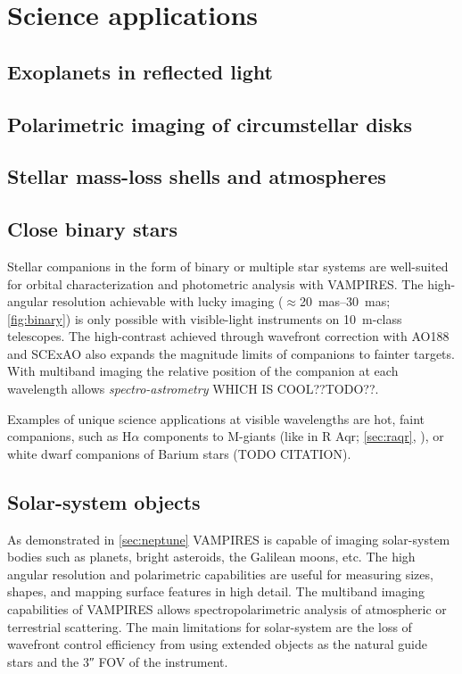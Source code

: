 \section{Science applications}\label{sec:science}

\subsection{Exoplanets in reflected light}

\subsection{Polarimetric imaging of circumstellar disks}

\subsection{Stellar mass-loss shells and atmospheres}

\subsection{Close binary stars}

Stellar companions in the form of binary or multiple star systems are well-suited for orbital characterization and photometric analysis with VAMPIRES. The high-angular resolution achievable with lucky imaging ($\approx$\SIrange{20}{30}{mas}; \autoref{fig:binary}) is only possible with visible-light instruments on \SI{10}{\meter}-class telescopes. The high-contrast achieved through wavefront correction with AO188 and SCExAO also expands the magnitude limits of companions to fainter targets. With multiband imaging the relative position of the companion at each wavelength allows \textit{spectro-astrometry} WHICH IS COOL??TODO??.

Examples of unique science applications at visible wavelengths are hot, faint companions, such as H$\alpha$ components to M-giants (like in R Aqr; \autoref{sec:raqr}, \citet{schmid_spherezimpol_2017}), or white dwarf companions of Barium stars (TODO CITATION).

\subsection{Solar-system objects}

As demonstrated in \autoref{sec:neptune} VAMPIRES is capable of imaging solar-system bodies such as planets, bright asteroids, the Galilean moons, etc. The high angular resolution and polarimetric capabilities are useful for measuring sizes, shapes, and mapping surface features in high detail. The multiband imaging capabilities of VAMPIRES allows spectropolarimetric analysis of atmospheric or terrestrial scattering. The main limitations for solar-system are the loss of wavefront control efficiency from using extended objects as the natural guide stars and the \ang{;;3} FOV of the instrument.

